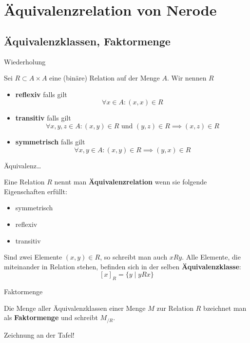

\section{Äquivalenzrelation von Nerode}
\subsection{Äquivalenzklassen, Faktormenge}
\begin{frame}{Wiederholung}
	\begin{Definition}
		Sei $R \subset A \times A$ eine (binäre) Relation auf der Menge $A$. Wir nennen $R$
		\begin{itemize}
			\item \textbf{reflexiv} falls gilt $$\forall x \in A: (x,x) \in R$$
			\item \textbf{transitiv} falls gilt $$\forall x,y,z \in A: (x,y) \in R \text{ und } (y,z) \in R \implies (x,z) \in R$$
			\item \textbf{symmetrisch} falls gilt $$\forall x,y \in A: (x,y) \in R \implies (y,x) \in R$$
		\end{itemize}
	\end{Definition}
\end{frame}
\begin{frame}{Äquivalenz\dots}
	\begin{Definition}
		Eine Relation $R$ nennt man \textbf{Äquivalenzrelation} wenn sie folgende Eigenschaften erfüllt:
		\begin{itemize}
			\item symmetrisch
			\item reflexiv
			\item transitiv
		\end{itemize}
	\end{Definition}
	\pause
	\begin{Definition}
		Sind zwei Elemente $(x,y) \in R$, so schreibt man auch $xRy$. Alle Elemente, die miteinander in Relation stehen, befinden sich in der selben \textbf{Äquivalenzklasse}: $$[x]_R = \{ y \mid yRx \}$$
	\end{Definition}
\end{frame}

\begin{frame}{Faktormenge}
	\begin{Definition}
		Die Menge aller Äquivalenzklassen einer Menge $M$ zur Relation $R$ bzeichnet man als \textbf{Faktormenge} und schreibt $M_{/R}$.
	\end{Definition}
	\pause
	Zeichnung an der Tafel!
\end{frame}

